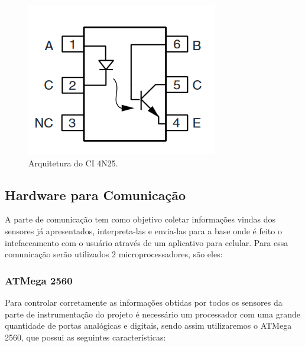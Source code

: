     \begin{figure}[H]                                                           
      		\centering                    
      		\includegraphics[scale=0.5]{figuras/optacoplador.png}               
      		\caption{Arquitetura do CI 4N25.}    
      		\label{img:optacoplador}                                            
    	\end{figure}     



\subsection{Hardware para Comunicação}
\label{sub:Hardwar_para_Comunicação}
  A parte de comunicação tem como objetivo coletar informações vindas dos sensores já apresentados, interpreta-las e envia-las para a base onde é feito o intefaceamento com o usuário através de um aplicativo para celular. Para essa comunicação serão utilizados 2 microprocessadores, são eles:

    \subsubsection{ATMega 2560}
    Para controlar corretamente as informações obtidas por todos os sensores da parte de instrumentação do projeto é necessário um processador com uma grande quantidade de portas analógicas e digitais, sendo assim utilizaremos o ATMega 2560, que possui as seguintes características:

